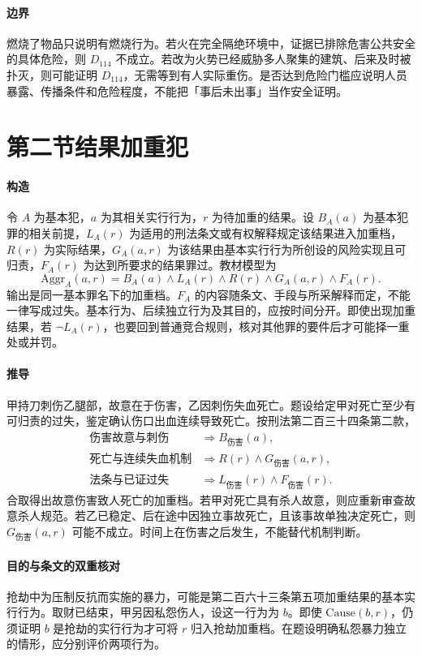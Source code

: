 \paragraph{边界}
燃烧了物品只说明有燃烧行为。若火在完全隔绝环境中，证据已排除危害公共安全的具体危险，则 $D_{114}$ 不成立。若改为火势已经威胁多人聚集的建筑、后来及时被扑灭，则可能证明 $D_{114}$，无需等到有人实际重伤。是否达到危险门槛应说明人员暴露、传播条件和危险程度，不能把「事后未出事」当作安全证明。

\section{第二节\quad 结果加重犯}

\paragraph{构造}
令 $A$ 为基本犯，$a$ 为其相关实行行为，$r$ 为待加重的结果。设 $B_A(a)$ 为基本犯罪的相关前提，$L_A(r)$ 为适用的刑法条文或有权解释规定该结果进入加重档，$R(r)$ 为实际结果，$G_A(a,r)$ 为该结果由基本实行行为所创设的风险实现且可归责，$F_A(r)$ 为达到所要求的结果罪过。教材模型为
\[
\mathrm{Aggr}_A(a,r)
  = B_A(a)\land L_A(r)\land R(r)\land G_A(a,r)\land F_A(r).
\]
输出是同一基本罪名下的加重档。$F_A$ 的内容随条文、手段与所采解释而定，不能一律写成过失。基本行为、后续独立行为及其目的，应按时间分开。即使出现加重结果，若 $\neg L_A(r)$，也要回到普通竞合规则，核对其他罪的要件后才可能择一重处或并罚。

\paragraph{推导}
甲持刀刺伤乙腿部，故意在于伤害，乙因刺伤失血死亡。题设给定甲对死亡至少有可归责的过失，鉴定确认伤口出血连续导致死亡。按刑法第二百三十四条第二款，
\[
\begin{aligned}
\text{伤害故意与刺伤}&\Longrightarrow B_{\text{伤害}}(a),\\
\text{死亡与连续失血机制}&\Longrightarrow R(r)\land G_{\text{伤害}}(a,r),\\
\text{法条与已证过失}&\Longrightarrow L_{\text{伤害}}(r)\land F_{\text{伤害}}(r).
\end{aligned}
\]
合取得出故意伤害致人死亡的加重档。若甲对死亡具有杀人故意，则应重新审查故意杀人规范。若乙已稳定、后在途中因独立事故死亡，且该事故单独决定死亡，则 $G_{\text{伤害}}(a,r)$ 可能不成立。时间上在伤害之后发生，不能替代机制判断。

\paragraph{目的与条文的双重核对}
抢劫中为压制反抗而实施的暴力，可能是第二百六十三条第五项加重结果的基本实行行为。取财已结束，甲另因私怨伤人，设这一行为为 $b$。即使 $\mathrm{Cause}(b,r)$，仍须证明 $b$ 是抢劫的实行行为才可将 $r$ 归入抢劫加重档。在题设明确私怨暴力独立的情形，应分别评价两项行为。

